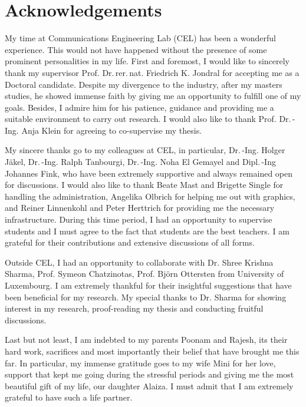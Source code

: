 \chapter*{Acknowledgements}

My time at Communications Engineering Lab (CEL) has been a wonderful experience. This would not have happened without the presence of some prominent personalities in my life. First and foremost, I would like to sincerely thank my supervisor Prof. Dr.\,rer.\,nat. Friedrich K. Jondral for accepting me as a Doctoral candidate. %
Despite my divergence to the industry, after my masters studies, he showed immense faith by giving me an opportunity to fulfill one of my goals. 
Besides, I admire him for his patience, guidance and providing me a suitable environment to carry out research. I would also like to thank Prof. Dr.\,-Ing. Anja Klein for agreeing to co-supervise my thesis.

My sincere thanks go to my colleagues at CEL, in particular, Dr.\,-Ing. Holger J\"akel, Dr.\,-Ing. Ralph Tanbourgi, Dr.\,-Ing. Noha El Gemayel and Dipl.\,-Ing Johannes Fink, who have been extremely supportive and always remained open for discussions. I would also like to thank Beate Mast and Brigette Single for handling the administration, Angelika Olbrich for helping me out with graphics, and Reiner Linnenkohl and Peter Herttrich for providing me the necessary infrastructure. During this time period, I had an opportunity to supervise students and I must agree to the fact that students are the best teachers. I am grateful for their contributions and extensive discussions of all forms. 

Outside CEL, I had an opportunity to collaborate with Dr. Shree Krishna Sharma, Prof. Symeon Chatzinotas, Prof. Bj\"orn Ottersten from University of Luxembourg. I am extremely thankful for their insightful suggestions that have been beneficial for my research. My special thanks to Dr. Sharma for showing interest in my research, proof-reading my thesis and conducting fruitful discussions. 

Last but not least, I am indebted to my parents Poonam and Rajesh, its their hard work, sacrifices and most importantly their belief that have brought me this far. In particular, my immense gratitude goes to my wife Mini for her love, support that kept me going during the stressful periods and giving me the most beautiful gift of my life, our daughter Alaiza. I must admit that I am extremely grateful to have such a life partner. 
